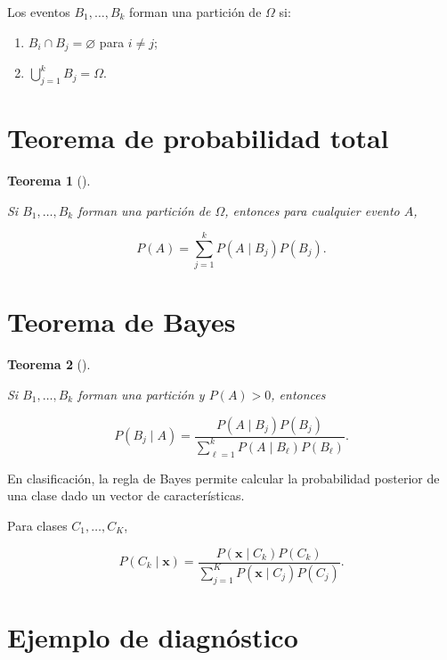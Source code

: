 \documentclass[
  spanish,
  11pt,
  letterpaper,
  DIV=11,
  numbers=noendperiod]{scrreprt}
\providecommand{\tightlist}{%
  \setlength{\itemsep}{0pt}\setlength{\parskip}{0pt}}
\theoremstyle{definition}
\theoremstyle{plain}
\newtheorem{theorem}{Teorema}[chapter]
\theoremstyle{definition}
\theoremstyle{remark}
\begin{document}
Los eventos \(B_1,\ldots,B_k\) forman una partición de \(\Omega\) si:

\begin{enumerate}
\def\labelenumi{\arabic{enumi}.}
\tightlist
\item
  \(B_i\cap B_j=\varnothing\) para \(i\neq j\);
\item
  \(\bigcup_{j=1}^{k}B_j=\Omega\).
\end{enumerate}

\section{Teorema de probabilidad
total}\label{teorema-de-probabilidad-total}

\begin{theorem}[]\protect\hypertarget{thm-probabilidad-total}{}\label{thm-probabilidad-total}

Si \(B_1,\ldots,B_k\) forman una partición de \(\Omega\), entonces para
cualquier evento \(A\),

\[
P(A)
=
\sum_{j=1}^{k}
P(A\mid B_j)P(B_j).
\]

\end{theorem}

\section{Teorema de Bayes}\label{teorema-de-bayes}

\begin{theorem}[]\protect\hypertarget{thm-bayes}{}\label{thm-bayes}

Si \(B_1,\ldots,B_k\) forman una partición y \(P(A)>0\), entonces

\[
P(B_j\mid A)
=
\frac{
P(A\mid B_j)P(B_j)
}{
\sum_{\ell=1}^{k}
P(A\mid B_\ell)P(B_\ell)
}.
\]

\end{theorem}

En clasificación, la regla de Bayes permite calcular la probabilidad
posterior de una clase dado un vector de características.

Para clases \(C_1,\ldots,C_K\),

\[
P(C_k\mid\mathbf{x})
=
\frac{
P(\mathbf{x}\mid C_k)P(C_k)
}{
\sum_{j=1}^{K}
P(\mathbf{x}\mid C_j)P(C_j)
}.
\]

\section{Ejemplo de diagnóstico}\label{ejemplo-de-diagnuxf3stico}
\end{document}

